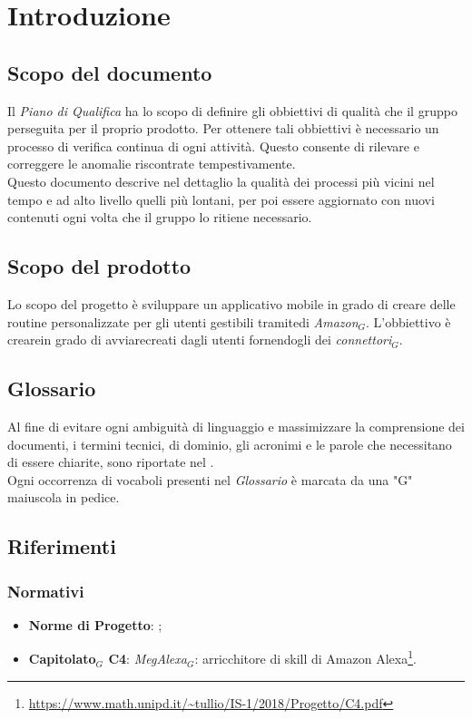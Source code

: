 \chapter{Introduzione}
\label{introduzione}
\section{Scopo del documento}
Il \textit{Piano di Qualifica} ha lo scopo di definire gli obbiettivi di qualità che il gruppo perseguita per il proprio prodotto. Per ottenere tali obbiettivi è necessario un processo di verifica continua di ogni attività. Questo consente di rilevare e correggere le anomalie riscontrate tempestivamente.\\
Questo documento descrive nel dettaglio la qualità dei processi più vicini nel tempo e ad alto livello quelli più lontani, per poi essere aggiornato con nuovi contenuti ogni volta che il gruppo lo ritiene necessario.
\section{Scopo del prodotto}
Lo scopo del progetto è sviluppare un applicativo mobile in grado di creare delle routine personalizzate per gli utenti gestibili tramitedi \textit{Amazon$_{G}$}. L'obbiettivo è crearein grado di avviarecreati dagli utenti fornendogli dei \textit{connettori$_{G}$}.
\section{Glossario}
Al fine di evitare ogni ambiguità di linguaggio e massimizzare la comprensione dei documenti, i termini tecnici, di dominio, gli acronimi e le parole che necessitano di essere chiarite, sono riportate nel \glossariodocumento.\\
Ogni occorrenza di vocaboli presenti nel \textit{Glossario} è marcata da una "G" maiuscola in pedice.
\section{Riferimenti}
\subsection{Normativi}
\label{RiferimentiNormativi}
\begin{itemize}
	\item  \textbf{Norme di Progetto}: \normediprogetto;
	\item \textbf{Capitolato$_{G}$ C4}: \textit{MegAlexa$_{G}$}: arricchitore di skill di Amazon Alexa\footnote{\url{https://www.math.unipd.it/~tullio/IS-1/2018/Progetto/C4.pdf}}.
\end{itemize}
